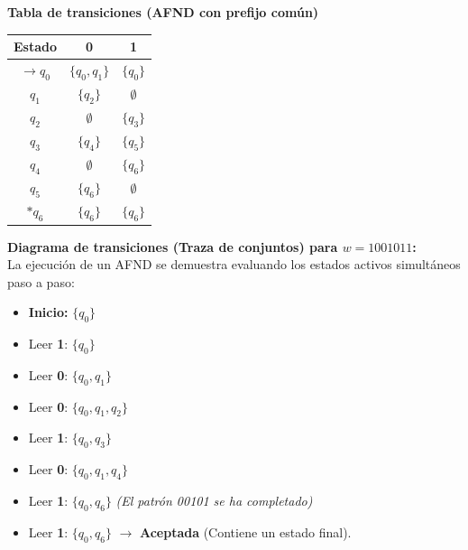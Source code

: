 \documentclass[12pt]{article}
\begin{document}
\begin{center}
\begin{minipage}{0.45\textwidth}
\begin{center}
    \textbf{Tabla de transiciones (AFND con prefijo común)} \\
    \vspace{0.3cm}
    \begin{tabular}{c|cc}
        Estado & 0 & 1 \\
        \hline
        $\rightarrow q_0$ & $\{q_0, q_1\}$ & $\{q_0\}$ \\
        $q_1$ & $\{q_2\}$ & $\emptyset$ \\
        $q_2$ & $\emptyset$ & $\{q_3\}$ \\
        $q_3$ & $\{q_4\}$ & $\{q_5\}$ \\
        $q_4$ & $\emptyset$ & $\{q_6\}$ \\
        $q_5$ & $\{q_6\}$ & $\emptyset$ \\
        $*q_6$ & $\{q_6\}$ & $\{q_6\}$ \\
    \end{tabular}
\end{center}
\vspace{0.3cm}
\end{minipage}
\hfill
\begin{minipage}{0.45\textwidth}

\vspace{0.3cm}
\textbf{Diagrama de transiciones (Traza de conjuntos) para $w = 1001011$:} \\
La ejecución de un AFND se demuestra evaluando los estados activos simultáneos paso a paso:
\begin{itemize}[noitemsep, label=-]
    \item \textbf{Inicio:} $\{q_0\}$
    \item Leer \textbf{1}: $\{q_0\}$
    \item Leer \textbf{0}: $\{q_0, q_1\}$
    \item Leer \textbf{0}: $\{q_0, q_1, q_2\}$
    \item Leer \textbf{1}: $\{q_0, q_3\}$
    \item Leer \textbf{0}: $\{q_0, q_1, q_4\}$
    \item Leer \textbf{1}: $\{q_0, q_6\}$ \textit{(El patrón 00101 se ha completado)}
    \item Leer \textbf{1}: $\{q_0, q_6\}$ $\rightarrow$ \textbf{Aceptada} (Contiene un estado final).
\end{itemize}


\end{minipage}
\end{center}
\end{document}
